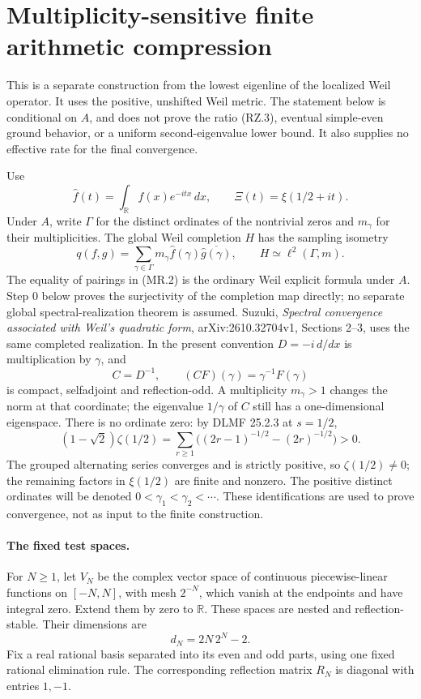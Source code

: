 \section{Multiplicity-sensitive finite arithmetic compression}
\label{sec:spectral-arithmetic-multiplicity}

This is a separate construction from the lowest eigenline of the
localized Weil operator.  It uses the positive, unshifted Weil metric.
The statement below is conditional on \(A\), and does not prove the
ratio (RZ.3), eventual simple-even ground behavior, or a uniform
second-eigenvalue lower bound.  It also supplies no effective rate for
the final convergence.

Use
\[
 \widehat f(t)=\int_{\mathbb R}f(x)e^{-itx}\,dx,\qquad
 \Xi(t)=\xi(1/2+it).
 \tag{MR.1}
\]
Under \(A\), write \(\Gamma\) for the distinct ordinates of the
nontrivial zeros and \(m_\gamma\) for their multiplicities.  The
global Weil completion \(H\) has the sampling isometry
\[
 q(f,g)=\sum_{\gamma\in\Gamma}
       m_\gamma\widehat f(\gamma)\overline{\widehat g(\gamma)},
 \qquad H\simeq\ell^2(\Gamma,m).
 \tag{MR.2}
\]
The equality of pairings in (MR.2) is the ordinary Weil explicit
formula under \(A\).  Step 0 below proves the surjectivity of the
completion map directly; no separate global spectral-realization
theorem is assumed.  Suzuki, \emph{Spectral convergence associated
with Weil's quadratic form}, arXiv:2610.32704v1, Sections 2--3,
uses the same completed realization.  In the present convention
\(D=-i\,d/dx\) is multiplication by \(\gamma\), and
\[
 C=D^{-1},\qquad (C F)(\gamma)=\gamma^{-1}F(\gamma)
 \tag{MR.3}
\]
is compact, selfadjoint and reflection-odd.  A multiplicity
\(m_\gamma>1\) changes the norm at that coordinate; the eigenvalue
\(1/\gamma\) of \(C\) still has a one-dimensional eigenspace.
There is no ordinate zero: by DLMF 25.2.3 at \(s=1/2\),
\[
 (1-\sqrt2)\zeta(1/2)
   =\sum_{r\ge1}\bigl((2r-1)^{-1/2}-(2r)^{-1/2}\bigr)>0.
\]
The grouped alternating series converges and is strictly positive,
so \(\zeta(1/2)\ne0\); the remaining factors in \(\xi(1/2)\)
are finite and nonzero.  The positive distinct ordinates
will be denoted \(0<\gamma_1<\gamma_2<\cdots\).
These identifications are used to prove convergence, not as input
to the finite construction.

\paragraph{The fixed test spaces.}
For \(N\ge1\), let \(V_N\) be the complex vector space of continuous
piecewise-linear functions on \([-N,N]\), with mesh \(2^{-N}\),
which vanish at the endpoints and have integral zero.  Extend
them by zero to \(\mathbb R\).  These spaces are nested and
reflection-stable.  Their dimensions are
\[
 d_N=2N\,2^N-2.
 \tag{MR.4}
\]
Fix a real rational basis separated into its even and odd parts,
using one fixed rational elimination rule.  The corresponding
reflection matrix \(R_N\) is diagonal with entries \(1,-1\).


